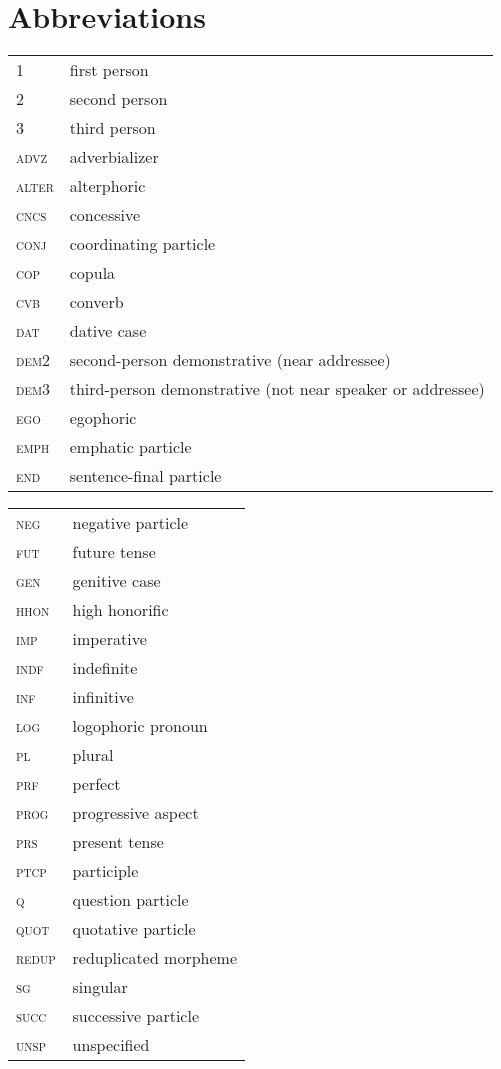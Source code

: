 \documentclass[output=paper]{langsci/langscibook}
\begin{document}
 
\section*{Abbreviations}


\begin{tabularx}{.45\textwidth}{lQ}
1 & first person\\
2 & second person\\ 
3 & third person\\ 
\textsc{advz} & adverbializer\\
\textsc{alter} & alterphoric\\ 
\textsc{cncs} & concessive\\ 
\textsc{conj} & coordinating particle\\
\textsc{cop} & copula\\
\textsc{cvb} & converb\\
\textsc{dat} & dative case\\
\textsc{dem}2 & second-person demonstrative (near addressee)\\
\textsc{dem}3 & third-person demonstrative (not near speaker or addressee)\\
\textsc{ego} & egophoric\\
\textsc{emph} & emphatic particle\\
\textsc{end} & sentence-final particle\\
\end{tabularx}
\begin{tabularx}{.45\textwidth}{lQ}\textsc{neg} & negative particle\\
\textsc{fut} & future tense\\ 
\textsc{gen} & genitive case\\
\textsc{hhon} & high honorific\\
\textsc{imp} & imperative\\
\textsc{indf} & indefinite\\ 
\textsc{inf} & infinitive\\ 
\textsc{log} & logophoric pronoun\\ 
\textsc{pl} & plural\\ 
\textsc{prf} & perfect\\ 
\textsc{prog} & progressive aspect\\ 
\textsc{prs} & present tense\\ 
\textsc{ptcp} & participle\\ 
\textsc{q} & question particle\\ 
\textsc{quot} & quotative particle\\ 
\textsc{redup} & reduplicated morpheme\\ 
\textsc{sg} & singular\\ 
\textsc{succ} & successive particle\\ 
\textsc{unsp} & unspecified\\
\end{tabularx}
\sloppy
\printbibliography[heading=subbibliography,notkeyword=this] 
\end{document}
